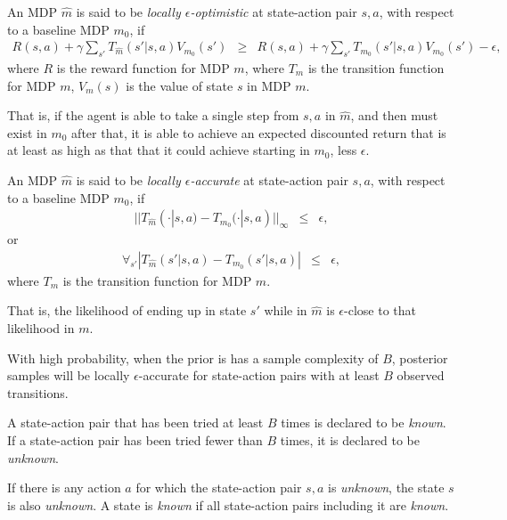 \begin{defn}
\label{sec:boss:defn:local-opt}

An MDP $\hat m$ is said to be \emph{locally $\epsilon$-optimistic} at state-action pair $s, a$, with respect to a baseline MDP $m_0$, if
\begin{eqnarray}
R(s,a)+\gamma \sum_{s'} T_{\hat m}(s'|s,a) V_{m_0}(s')
&\geq&R(s,a)+\gamma \sum_{s'} T_{m_0}(s'|s,a) V_{m_0}(s') - \epsilon,
\end{eqnarray}
where $R$ is the reward function for MDP $m$, where $T_{m}$ is the transition function for MDP $m$, $V_m(s)$ is the value of state $s$ in MDP $m$.

That is, if the agent is able to take a single step from $s,a$ in $\hat m$, and then must exist in $m_0$ after that, it is able to achieve an expected discounted return that is at least as high as that that it could achieve starting in $m_0$, less $\epsilon$.

\end{defn}

\begin{defn}
\label{sec:boss:defn:local-acc}

An MDP $\hat m$ is said to be \emph{locally $\epsilon$-accurate} at state-action pair $s, a$, with respect to a baseline MDP $m_0$, if
\begin{eqnarray}
||T_{\hat m}(\cdot|s,a) - T_{m_0}(\cdot|s,a)||_\infty &\leq& \epsilon,
\end{eqnarray}
or
\begin{eqnarray}
\forall_{s'} \left|T_{\hat m}(s'|s,a) - T_{m_0}(s'|s,a)\right| &\leq& \epsilon,
\end{eqnarray}
where $T_{m}$ is the transition function for MDP $m$.

That is, the likelihood of ending up in state $s'$ while in $\hat m$ is $\epsilon$-close to that likelihood in $m$.

With high probability, when the prior is has a sample complexity of $B$, posterior samples will be locally $\epsilon$-accurate for state-action pairs with at least $B$ observed transitions.

\end{defn}

\begin{defn}

A state-action pair that has been tried at least $B$ times is declared to be \emph{known}. If a state-action pair has been tried fewer than $B$ times, it is declared to be \emph{unknown}.

If there is any action $a$ for which the state-action pair $s,a$ is \emph{unknown}, the state $s$ is also \emph{unknown}. A state is \emph{known} if all state-action pairs including it are \emph{known}.
\end{defn}

